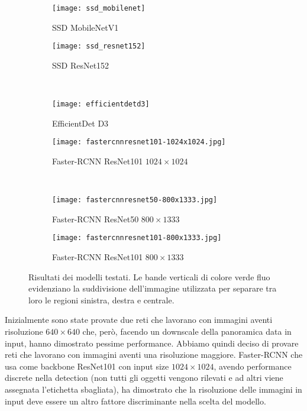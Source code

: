 \begin{figure}[t]
    \centering
    \hfill
    \begin{subfigure}[b]{0.49\textwidth}
        \centering
        \texttt{[image: ssd\_mobilenet]}
        \caption{SSD MobileNetV1}
    \end{subfigure}
    \hfill
    \begin{subfigure}[b]{0.49\textwidth}
        \centering
        \texttt{[image: ssd\_resnet152]}
        \caption{SSD ResNet152}
    \end{subfigure}
    \hfill \\
    \hfill
    \begin{subfigure}[b]{0.49\textwidth}
        \centering
        \texttt{[image: efficientdetd3]}
        \caption{EfficientDet D3}
    \end{subfigure}
    \hfill
    \begin{subfigure}[b]{0.49\textwidth}
        \centering
        \texttt{[image: fastercnnresnet101-1024x1024.jpg]}
        \caption{Faster-RCNN ResNet101 $1024\times 1024$}
    \end{subfigure}
    \hfill \\
    \hfill
    \begin{subfigure}[b]{0.49\textwidth}
        \centering
        \texttt{[image: fastercnnresnet50-800x1333.jpg]}
        \caption{Faster-RCNN ResNet50 $800\times 1333$}
    \end{subfigure}
    \hfill
    \begin{subfigure}[b]{0.49\textwidth}
        \centering
        \texttt{[image: fastercnnresnet101-800x1333.jpg]}
        \caption{Faster-RCNN ResNet101 $800\times 1333$}
    \end{subfigure}
    \hfill
    \caption{Risultati dei modelli testati. Le bande verticali di colore verde fluo evidenziano la suddivisione dell’immagine utilizzata per separare tra loro le regioni sinistra, destra e centrale.}
\end{figure}

Inizialmente sono state provate due reti che lavorano con immagini aventi risoluzione $640 \times 640$ che, però, facendo un downscale della panoramica data in input, hanno dimostrato pessime performance.
Abbiamo quindi deciso di provare reti che lavorano con immagini aventi una risoluzione maggiore. Faster-RCNN che usa come backbone ResNet101 con input size $1024 \times 1024$, avendo performance discrete nella detection (non tutti gli oggetti vengono rilevati e ad altri viene assegnata l’etichetta sbagliata), ha dimostrato che la risoluzione delle immagini in input deve essere un altro fattore discriminante nella scelta del modello.

